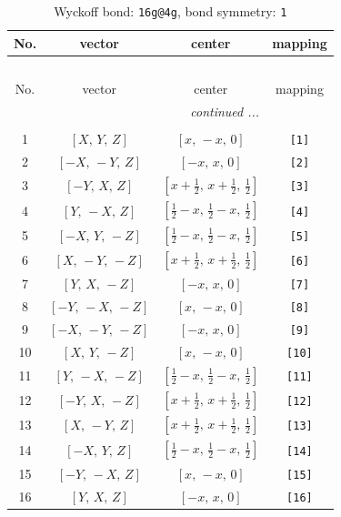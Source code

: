 \documentclass[fleqn,8pt]{jsarticle}
\begin{document}
\begin{longtable}{cccc}
\caption{Wyckoff bond: {\tt 16g@4g}, bond symmetry: {\tt 1}}
 \\
 \hline \hline
No. & vector & center & mapping \\ \hline \endfirsthead

\multicolumn{3}{l}{\tablename\ \thetable{}} \\
 \hline \hline
No. & vector & center & mapping \\ \hline \endhead

 \hline \hline
\multicolumn{3}{r}{\footnotesize\it continued ...} \\ \endfoot

 \hline \hline
\multicolumn{3}{r}{} \\ \endlastfoot

1 & $\left[ X,\, Y,\, Z \right]$ & $\left[ x,\, - x,\, 0 \right]$ & {\tt [1]} \\ \hline
2 & $\left[ - X,\, - Y,\, Z \right]$ & $\left[ - x,\, x,\, 0 \right]$ & {\tt [2]} \\ \hline
3 & $\left[ - Y,\, X,\, Z \right]$ & $\left[ x + \frac{1}{2},\, x + \frac{1}{2},\, \frac{1}{2} \right]$ & {\tt [3]} \\ \hline
4 & $\left[ Y,\, - X,\, Z \right]$ & $\left[ \frac{1}{2} - x,\, \frac{1}{2} - x,\, \frac{1}{2} \right]$ & {\tt [4]} \\ \hline
5 & $\left[ - X,\, Y,\, - Z \right]$ & $\left[ \frac{1}{2} - x,\, \frac{1}{2} - x,\, \frac{1}{2} \right]$ & {\tt [5]} \\ \hline
6 & $\left[ X,\, - Y,\, - Z \right]$ & $\left[ x + \frac{1}{2},\, x + \frac{1}{2},\, \frac{1}{2} \right]$ & {\tt [6]} \\ \hline
7 & $\left[ Y,\, X,\, - Z \right]$ & $\left[ - x,\, x,\, 0 \right]$ & {\tt [7]} \\ \hline
8 & $\left[ - Y,\, - X,\, - Z \right]$ & $\left[ x,\, - x,\, 0 \right]$ & {\tt [8]} \\ \hline
9 & $\left[ - X,\, - Y,\, - Z \right]$ & $\left[ - x,\, x,\, 0 \right]$ & {\tt [9]} \\ \hline
10 & $\left[ X,\, Y,\, - Z \right]$ & $\left[ x,\, - x,\, 0 \right]$ & {\tt [10]} \\ \hline
11 & $\left[ Y,\, - X,\, - Z \right]$ & $\left[ \frac{1}{2} - x,\, \frac{1}{2} - x,\, \frac{1}{2} \right]$ & {\tt [11]} \\ \hline
12 & $\left[ - Y,\, X,\, - Z \right]$ & $\left[ x + \frac{1}{2},\, x + \frac{1}{2},\, \frac{1}{2} \right]$ & {\tt [12]} \\ \hline
13 & $\left[ X,\, - Y,\, Z \right]$ & $\left[ x + \frac{1}{2},\, x + \frac{1}{2},\, \frac{1}{2} \right]$ & {\tt [13]} \\ \hline
14 & $\left[ - X,\, Y,\, Z \right]$ & $\left[ \frac{1}{2} - x,\, \frac{1}{2} - x,\, \frac{1}{2} \right]$ & {\tt [14]} \\ \hline
15 & $\left[ - Y,\, - X,\, Z \right]$ & $\left[ x,\, - x,\, 0 \right]$ & {\tt [15]} \\ \hline
16 & $\left[ Y,\, X,\, Z \right]$ & $\left[ - x,\, x,\, 0 \right]$ & {\tt [16]} \\
\end{longtable}
\end{document}
